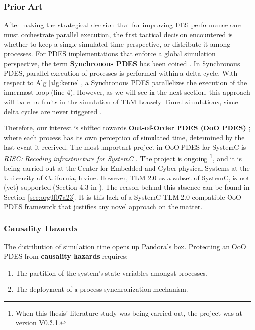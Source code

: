 \documentclass[11pt]{article}
\begin{document}
\subsubsection{Prior Art}
\label{sec:org46b5866}
After making the strategical decision that for improving DES performance one must orchestrate parallel execution, the first tactical decision encountered is whether to keep a single simulated time perspective, or distribute it among processes.
For PDES implementations that enforce a global simulation perspective, the term \textbf{Synchronous PDES} has been coined \cite{Schumacher2010} \cite{Moy}.
In Synchronous PDES, parallel execution of processes is performed within a delta cycle. 
With respect to Alg \ref{alg:kernel}, a Synchronous PDES parallelizes the execution of the innermost loop (line 4).
However, as we will see in the next section, this approach will bare no fruits in the simulation of TLM Loosely Timed simulations, since delta cycles are never triggered \cite{Chen2012}.

Therefore, our interest is shifted towards \textbf{Out-of-Order PDES (OoO PDES)} \cite{Chen2015};  where each process has its own perception of simulated time, determined by the last event it received.
The most important project in OoO PDES for SystemC is \textit{RISC: Recoding infrastructure for SystemC} \cite{Liu2015}.
The project is ongoing \footnote{When this thesis' literature study was being carried out, the project was at version V0.2.1.}, and it is being carried out at the Center for Embedded and Cyber-physical Systems at the University of California, Irvine.
However, TLM 2.0 as a subset of SystemC, is not (yet) supported (Section 4.3 in \cite{Liu2015}).
The reason behind this absence can be found in Section \ref{sec:org0f07a23}.
It is this lack of a SystemC TLM 2.0 compatible OoO PDES framework that justifies any novel approach on the matter.



\subsubsection{Causality Hazards}
\label{sec:org753f450}
The distribution of simulation time opens up Pandora's box.
Protecting an OoO PDES from \textbf{causality hazards} requires:
\begin{enumerate}
\item The partition of the system's state variables amongst processes.
\item The deployment of a process synchronization mechanism.
\end{enumerate}
\end{document}
